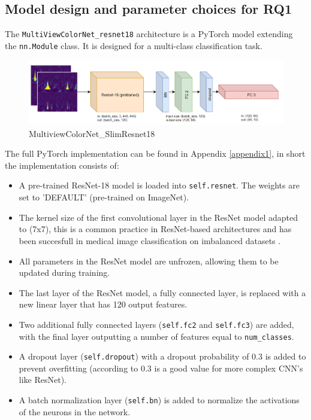\subsection{Model design and parameter choices for RQ1}
\label{model_RQ1}
The \verb|MultiViewColorNet_resnet18| architecture is a PyTorch model extending the \newline \verb|nn.Module| class. It is designed for a multi-class classification task. 
\begin{figure}[H]
    \centering
    \includegraphics[width=1.0\textwidth]{Images/SlimResnet18_Multiview_CL.png}
    \caption{MultiviewColorNet\_SlimResnet18}
    \label{fig:slimresnet18_multiview}
\end{figure}
The full PyTorch implementation can be found in Appendix \ref{appendix1}, in short the implementation consists of:
\begin{itemize}
    \item A pre-trained ResNet-18 model is loaded into \verb|self.resnet|. The weights are set to 'DEFAULT' (pre-trained on ImageNet). 
    \item The kernel size of the first convolutional layer in the ResNet model adapted to (7x7), this is a common practice in ResNet-based architectures \citep{tomen2021spectral} and has been succesfull in medical image classification on imbalanced datasets \citep{mursalim2021multi}.
    \item All parameters in the ResNet model are unfrozen, allowing them to be updated during training. 
    \item The last layer of the ResNet model, a fully connected layer, is replaced with a new linear layer that has 120 output features. 
    \item Two additional fully connected layers (\verb|self.fc2| and \verb|self.fc3|) are added, with the final layer outputting a number of features equal to \verb|num_classes|.
    \item A dropout layer (\verb|self.dropout|) with a dropout probability of 0.3 is added to prevent overfitting (according to \citep{park2017analysis} 0.3 is a good value for more complex CNN's like ResNet). 
    \item A batch normalization layer (\verb|self.bn|) is added to normalize the activations of the neurons in the network. 
\end{itemize}

